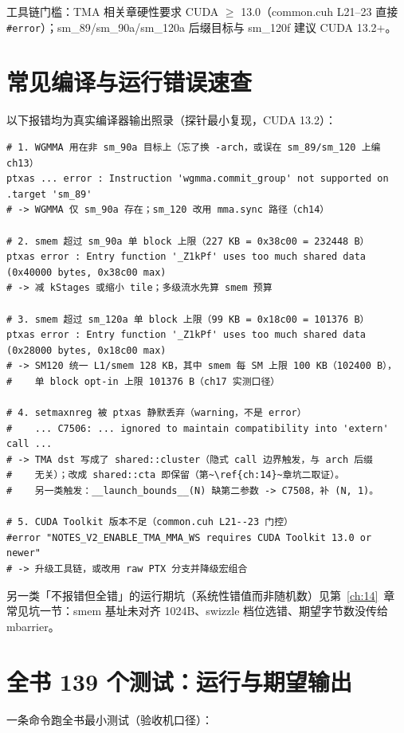 工具链门槛：TMA 相关章硬性要求 CUDA $\ge$ 13.0（common.cuh L21--23 直接
\texttt{\#error}）；sm\_89/sm\_90a/sm\_120a 后缀目标与 sm\_120f 建议
CUDA 13.2+。

\section{常见编译与运行错误速查}

以下报错均为真实编译器输出照录（探针最小复现，CUDA 13.2）：

\begin{lstlisting}[style=console]
# 1. WGMMA 用在非 sm_90a 目标上（忘了换 -arch，或误在 sm_89/sm_120 上编 ch13）
ptxas ... error : Instruction 'wgmma.commit_group' not supported on .target 'sm_89'
# -> WGMMA 仅 sm_90a 存在；sm_120 改用 mma.sync 路径（ch14）

# 2. smem 超过 sm_90a 单 block 上限（227 KB = 0x38c00 = 232448 B）
ptxas error : Entry function '_Z1kPf' uses too much shared data (0x40000 bytes, 0x38c00 max)
# -> 减 kStages 或缩小 tile；多级流水先算 smem 预算

# 3. smem 超过 sm_120a 单 block 上限（99 KB = 0x18c00 = 101376 B）
ptxas error : Entry function '_Z1kPf' uses too much shared data (0x28000 bytes, 0x18c00 max)
# -> SM120 统一 L1/smem 128 KB，其中 smem 每 SM 上限 100 KB（102400 B），
#    单 block opt-in 上限 101376 B（ch17 实测口径）

# 4. setmaxnreg 被 ptxas 静默丢弃（warning，不是 error）
#    ... C7506: ... ignored to maintain compatibility into 'extern' call ...
# -> TMA dst 写成了 shared::cluster（隐式 call 边界触发，与 arch 后缀
#    无关）；改成 shared::cta 即保留（第~\ref{ch:14}~章坑二取证）。
#    另一类触发：__launch_bounds__(N) 缺第二参数 -> C7508，补 (N, 1)。

# 5. CUDA Toolkit 版本不足（common.cuh L21--23 门控）
#error "NOTES_V2_ENABLE_TMA_MMA_WS requires CUDA Toolkit 13.0 or newer"
# -> 升级工具链，或改用 raw PTX 分支并降级宏组合
\end{lstlisting}

另一类「不报错但全错」的运行期坑（系统性错值而非随机数）见第~\ref{ch:14}~章
常见坑一节：smem 基址未对齐 1024B、swizzle 档位选错、期望字节数没传给
mbarrier。

\section{全书 139 个测试：运行与期望输出}

一条命令跑全书最小测试（验收机口径）：

